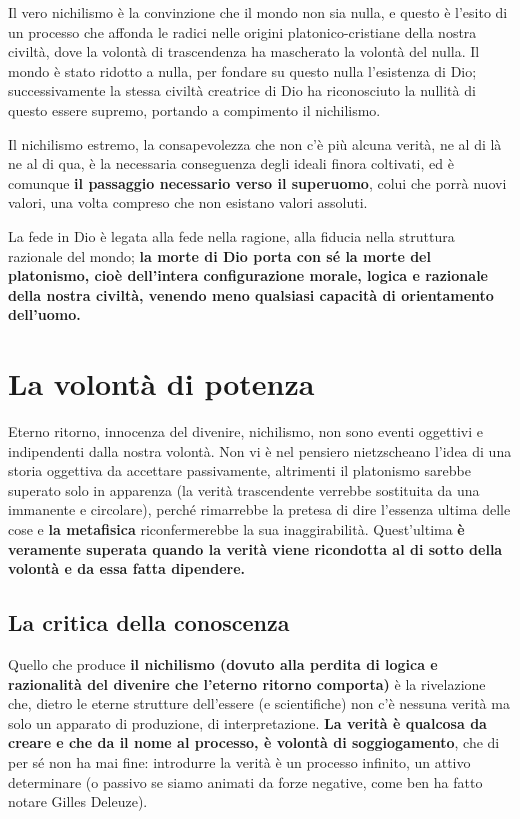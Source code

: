 Il vero nichilismo è la convinzione che il mondo non sia nulla, e questo è l'esito di un processo che affonda le radici nelle origini platonico-cristiane della nostra civiltà, dove la volontà di trascendenza ha mascherato la volontà del nulla. Il mondo è stato ridotto a nulla, per fondare su questo nulla l'esistenza di Dio; successivamente la stessa civiltà creatrice di Dio ha riconosciuto la nullità di questo essere supremo, portando a compimento il nichilismo.

Il nichilismo estremo, la consapevolezza che non c'è più alcuna verità, ne al di là ne al di qua, è la necessaria conseguenza degli ideali finora coltivati, ed è comunque \textbf{il passaggio necessario verso il superuomo}, colui che porrà nuovi valori, una volta compreso che non esistano valori assoluti.

La fede in Dio è legata alla fede nella ragione, alla fiducia nella struttura razionale del mondo; \textbf{la morte di Dio porta con sé la morte del platonismo, cioè dell'intera configurazione morale, logica e razionale della nostra civiltà, venendo meno qualsiasi capacità di orientamento dell'uomo.}

\section{La volontà di potenza}

Eterno ritorno, innocenza del divenire, nichilismo, non sono eventi oggettivi e indipendenti dalla nostra volontà. Non vi è nel pensiero nietzscheano l'idea di una storia oggettiva da accettare passivamente, altrimenti il platonismo sarebbe superato solo in apparenza (la verità trascendente verrebbe sostituita da una immanente e circolare), perché rimarrebbe la pretesa di dire l'essenza ultima delle cose e \textbf{la metafisica} riconfermerebbe la sua inaggirabilità. Quest'ultima \textbf{è veramente superata quando la verità viene ricondotta al di sotto della volontà e da essa fatta dipendere.}

\subsection{La critica della conoscenza}

Quello che produce \textbf{il nichilismo (dovuto alla perdita di logica e razionalità del divenire che l'eterno ritorno comporta)} è la rivelazione che, dietro le eterne strutture dell'essere (e scientifiche) non c'è nessuna verità ma solo un apparato di produzione, di interpretazione. \textbf{La verità è qualcosa da creare e che da il nome al processo, è volontà di soggiogamento}, che di per sé non ha mai fine: introdurre la verità è un processo infinito, un attivo determinare (o passivo se siamo animati da forze negative, come ben ha fatto notare Gilles Deleuze).

